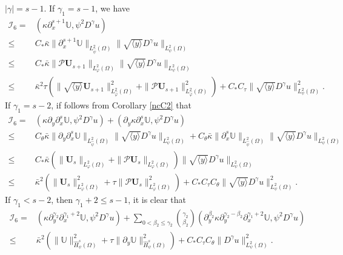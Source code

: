 \documentclass{amsart}
\numberwithin{equation}{section}
\newcommand\y{{{\langle y \rangle}}}
\begin{document}
 $|\gamma|=s-1$. If $\gamma_{1}=s-1$, we have
\begin{align*}
\mathcal{I}_{6}
=&(\kappa\partial_{x}^{s+1}\mathbb{U}, \psi^{2}D^{\gamma}u)\\
\leq& C_{*}\bar{\kappa}\|\partial_{x}^{s+1}\mathbb{U}\|_{L_{\hat{\psi}}^{2}(\Omega)}\|\sqrt{\y}D^{\gamma}u\|_{L_{\psi}^{2}(\Omega)}\\
\leq& C_{*}\bar{\kappa}\|\mathcal{P}\mathbf{U}_{s+1}\|_{L_{\varphi}^{2}(\Omega)}\|\sqrt{\y}D^{\gamma}u\|_{L_{\psi}^{2}(\Omega)}\\
\leq& \bar{\kappa}^{2}\tau
      \left(\|\sqrt{\y}\mathbf{U}_{s+1}\|_{L_{\hat{\varphi}}^{2}(\Omega)}^{2}+\|\mathcal{P}\mathbf{U}_{s+1}\|_{L_{\hat{\varphi}}^{2}(\Omega)}^{2}\right)
     +C_{*}C_{\tau}\|\sqrt{\y}D^{\gamma}u\|_{L_{\psi}^{2}(\Omega)}^{2}.
\end{align*}
If $\gamma_{1}=s-2$, if follows from Corollary \ref{ncC2} that
\begin{align*}
\mathcal{I}_{6}
=& (\kappa\partial_{y}\partial_{x}^{s}\mathbb{U}, \psi^{2}D^{\gamma}u)
  +(\partial_{y}\kappa\partial_{x}^{s}\mathbb{U}, \psi^{2}D^{\gamma}u)\\
\leq& C_{\theta}\bar{\kappa}\|\partial_{y}\partial_{x}^{s}\mathbb{U}\|_{L_{\hat{\psi}}^{2}(\Omega)}\|\sqrt{\y}D^{\gamma}u\|_{L_{\psi}^{2}(\Omega)}
     +C_{\theta}\bar{\kappa}\|\partial_{x}^{s}\mathbb{U}\|_{L_{\hat{\psi}}^{2}(\Omega)}\|\sqrt{\y}D^{\gamma}u\|_{L_{\psi}^{2}(\Omega)}\\
\leq& C_{*}\bar{\kappa}\left(\|\mathbf{U}_{s}\|_{L_{\varphi}^{2}(\Omega)}+\|\mathcal{P}\mathbf{U}_{s}\|_{L_{\varphi}^{2}(\Omega)}\right)
           \|\sqrt{\y}D^{\gamma}u\|_{L_{\psi}^{2}(\Omega)}\\
\leq& \bar{\kappa}^{2}\left(\|\mathbf{U}_{s}\|_{L_{\varphi}^{2}(\Omega)}^{2}
                            +\tau\|\mathcal{P}\mathbf{U}_{s}\|_{L_{\varphi}^{2}(\Omega)}^{2}\right)
     +C_{*}C_{\tau}C_{\theta}\|\sqrt{\y}D^{\gamma}u\|_{L_{\psi}^{2}(\Omega)}^{2}.
\end{align*}
If $\gamma_{1}<s-2$, then $\gamma_{1}+2\leq s-1$, it is clear that
\begin{align*}
\mathcal{I}_{6}
=& (\kappa\partial_{y}^{\gamma_{2}}\partial_{x}^{\gamma_{1}+2}\mathbb{U},\psi^{2}D^{\gamma}u)
  +\sum_{0<\beta_{2}\leq\gamma_{2}}\binom{\gamma_{2}}{\beta_{2}}
   (\partial_{y}^{\beta_{2}}\kappa\partial_{y}^{\gamma_{2}-\beta_{2}}\partial_{x}^{\gamma_{1}+2}\mathbb{U},\psi^{2}D^{\gamma}u)\\
\leq& \bar{\kappa}^{2}\left(\|\mathbb{U}\|_{\hat{H}_{\psi}^{s}(\Omega)}^{2}+\tau\|\partial_{y}\mathbb{U}\|_{\hat{H}_{\psi}^{s}(\Omega)}^{2}\right)
     +C_{*}C_{\tau}C_{\theta}\|D^{\gamma}u\|_{L_{\psi}^{2}(\Omega)}^{2}.
\end{align*}
\end{document}
